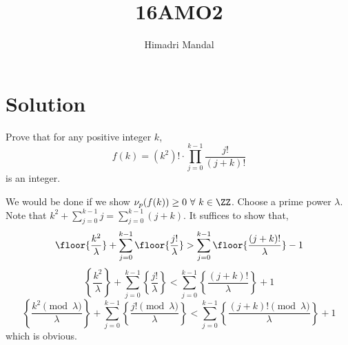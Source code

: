 \documentclass[11pt]{scrartcl}
\title{16AMO2}
\author{Himadri Mandal}
\begin{document}
\maketitle

\section{Solution}
\begin{prob}
  Prove that for any positive integer $k$,
  \[ f(k) = \displaystyle \left( k^2 \right)! \cdot \prod_{j = 0}^{k-1} \dfrac{j!}{(j+k)!} \]
  is an integer.
\end{prob}
\begin{soln}
  We would be done if we show $\nu_p (f(k)) \geq 0 \ \forall \ k \in \ZZ $. Choose a prime power $\lambda$. 
  Note that $k^2 + \sum_{j=0}^{k-1} j = \sum_{j=0}^{k-1}(j+k)$. It suffices to show that, 
  \[ \floor{\dfrac{k^2}{\lambda}} + \sum_{j=0}^{k-1} \floor{\dfrac{j!}{\lambda}} > \sum_{j=0}^{k-1}\floor{\dfrac{(j+k)!}{\lambda}} -1 \]
  \[ \left\{ \dfrac{k^2}{\lambda} \right\} + \sum_{j=0}^{k-1} \left\{\dfrac{j!}{\lambda} \right\} < \sum_{j=0}^{k-1} \left\{ {\dfrac{(j+k)!}{\lambda}} \right\} +1\] 
  \[ \left\{ \dfrac{k^2 \pmod{\lambda}}{\lambda} \right\} + \sum_{j=0}^{k-1} \left\{ \frac{j! \pmod{\lambda}}{\lambda}  \right\} < \sum_{j=0}^{k-1} \left\{ \frac{(j+k)! \pmod{\lambda}}{\lambda} \right\} +1 \]
  which is obvious.
  
\end{soln}
\end{document}
